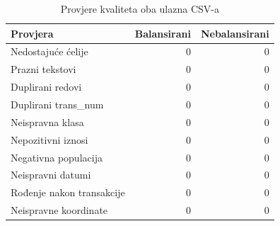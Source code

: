 \begin{table}[H]\centering\small
\caption{Provjere kvaliteta oba ulazna CSV-a}
\begin{tabularx}{\linewidth}{@{}Yrr@{}}\toprule
Provjera & Balansirani & Nebalansirani \\ \midrule
Nedostajuće ćelije & 0 & 0 \\
Prazni tekstovi & 0 & 0 \\
Duplirani redovi & 0 & 0 \\
Duplirani trans\_num & 0 & 0 \\
Neispravna klasa & 0 & 0 \\
Nepozitivni iznosi & 0 & 0 \\
Negativna populacija & 0 & 0 \\
Neispravni datumi & 0 & 0 \\
Rođenje nakon transakcije & 0 & 0 \\
Neispravne koordinate & 0 & 0 \\
\bottomrule\end{tabularx}\end{table}
